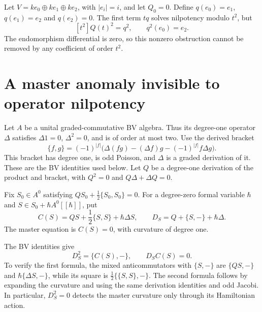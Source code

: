 \begin{example}\label{cbc:anomaly:brst-example}
Let $V=ke_0\oplus ke_1\oplus ke_2$, with $|e_i|=i$, and let $Q_0=0$.
Define $q(e_0)=e_1$, $q(e_1)=e_2$ and $q(e_2)=0$.
The first term $tq$ solves nilpotency modulo $t^2$, but
\[
 [t^2]Q(t)^2=q^2,\qquad q^2(e_0)=e_2.
\]
The endomorphism differential is zero, so this nonzero obstruction cannot be removed by any coefficient of order $t^2$.
\end{example}

\section{A master anomaly invisible to operator nilpotency}

Let $A$ be a unital graded-commutative BV algebra.
Thus its degree-one operator $\Delta$ satisfies $\Delta1=0$, $\Delta^2=0$, and is of order at most two.
Use the derived bracket
\begin{equation}\label{eq:cbc:anomaly:BV-bracket}
 \{f,g\}=(-1)^{|f|}
 \bigl(\Delta(fg)-(\Delta f)g-(-1)^{|f|}f\Delta g\bigr).
\end{equation}
This bracket has degree one, is odd Poisson, and $\Delta$ is a graded derivation of it.
These are the BV identities used below.
Let $Q$ be a degree-one derivation of the product and bracket, with $Q^2=0$ and $Q\Delta+\Delta Q=0$.

Fix $S_0\in A^0$ satisfying $QS_0+\tfrac12\{S_0,S_0\}=0$.
For a degree-zero formal variable $\hbar$ and $S\in S_0+\hbar A^0[[\hbar]]$, put
\[
 C(S)=QS+\frac12\{S,S\}+\hbar\Delta S,
 \qquad D_S=Q+\{S,-\}+\hbar\Delta.
\]
The master equation is $C(S)=0$, with curvature of degree one.

The BV identities give
\begin{equation}\label{eq:cbc:anomaly:quantum-square}
 D_S^2=\{C(S),-\},\qquad D_SC(S)=0.
\end{equation}
To verify the first formula, the mixed anticommutators with $\{S,-\}$ are $\{QS,-\}$ and $\hbar\{\Delta S,-\}$, while its square is $\tfrac12\{\{S,S\},-\}$.
The second formula follows by expanding the curvature and using the same derivation identities and odd Jacobi.
In particular, $D_S^2=0$ detects the master curvature only through its Hamiltonian action.

